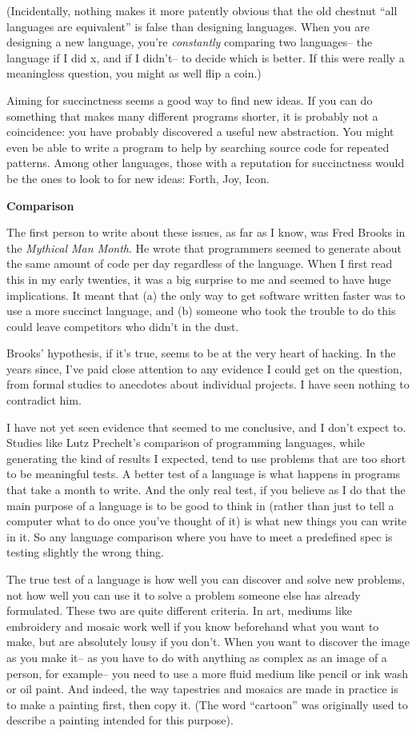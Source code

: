 (Incidentally, nothing makes it more patently obvious that the old
chestnut ``all languages are equivalent'' is false than designing
languages. When you are designing a new language, you're
\emph{constantly} comparing two languages-- the language if I did x, and
if I didn't-- to decide which is better. If this were really a
meaningless question, you might as well flip a coin.)

Aiming for succinctness seems a good way to find new ideas. If you can
do something that makes many different programs shorter, it is probably
not a coincidence: you have probably discovered a useful new
abstraction. You might even be able to write a program to help by
searching source code for repeated patterns. Among other languages,
those with a reputation for succinctness would be the ones to look to
for new ideas: Forth, Joy, Icon.

\textbf{Comparison}

The first person to write about these issues, as far as I know, was Fred
Brooks in the \emph{Mythical Man Month}. He wrote that programmers
seemed to generate about the same amount of code per day regardless of
the language. When I first read this in my early twenties, it was a big
surprise to me and seemed to have huge implications. It meant that (a)
the only way to get software written faster was to use a more succinct
language, and (b) someone who took the trouble to do this could leave
competitors who didn't in the dust.

Brooks' hypothesis, if it's true, seems to be at the very heart of
hacking. In the years since, I've paid close attention to any evidence I
could get on the question, from formal studies to anecdotes about
individual projects. I have seen nothing to contradict him.

I have not yet seen evidence that seemed to me conclusive, and I don't
expect to. Studies like Lutz Prechelt's comparison of programming
languages, while generating the kind of results I expected, tend to use
problems that are too short to be meaningful tests. A better test of a
language is what happens in programs that take a month to write. And the
only real test, if you believe as I do that the main purpose of a
language is to be good to think in (rather than just to tell a computer
what to do once you've thought of it) is what new things you can write
in it. So any language comparison where you have to meet a predefined
spec is testing slightly the wrong thing.

The true test of a language is how well you can discover and solve new
problems, not how well you can use it to solve a problem someone else
has already formulated. These two are quite different criteria. In art,
mediums like embroidery and mosaic work well if you know beforehand what
you want to make, but are absolutely lousy if you don't. When you want
to discover the image as you make it-- as you have to do with anything
as complex as an image of a person, for example-- you need to use a more
fluid medium like pencil or ink wash or oil paint. And indeed, the way
tapestries and mosaics are made in practice is to make a painting first,
then copy it. (The word ``cartoon'' was originally used to describe a
painting intended for this purpose).


